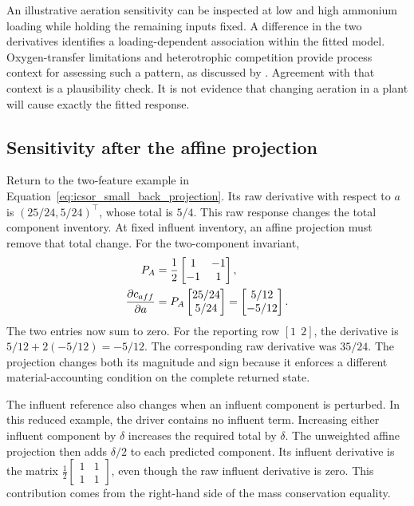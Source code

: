 An illustrative aeration sensitivity can be inspected at low and high ammonium loading while holding the remaining inputs fixed. A difference in the two derivatives identifies a loading-dependent association within the fitted model. Oxygen-transfer limitations and heterotrophic competition provide process context for assessing such a pattern, as discussed by \citet{StenstromSong1991}. Agreement with that context is a plausibility check. It is not evidence that changing aeration in a plant will cause exactly the fitted response.

\subsection{Sensitivity after the affine projection}

Return to the two-feature example in Equation~\eqref{eq:icsor_small_back_projection}. Its raw derivative with respect to \(a\) is \((25/24,5/24)^\top\), whose total is \(5/4\). This raw response changes the total component inventory. At fixed influent inventory, an affine projection must remove that total change. For the two-component invariant,
\begin{equation}
\equationname{Illustrative operating derivative after affine projection}
\label{eq:icsor_small_projection_derivative}
\begin{aligned}
P_A&=\frac{1}{2}\begin{bmatrix}1&-1\\-1&1\end{bmatrix},\\
\frac{\partial c_{aff}}{\partial a}
&=P_A\begin{bmatrix}25/24\\5/24\end{bmatrix}
=\begin{bmatrix}5/12\\-5/12\end{bmatrix}.
\end{aligned}
\end{equation}
The two entries now sum to zero. For the reporting row \([1\ \ 2]\), the derivative is \(5/12+2(-5/12)=-5/12\). The corresponding raw derivative was \(35/24\). The projection changes both its magnitude and sign because it enforces a different material-accounting condition on the complete returned state.

The influent reference also changes when an influent component is perturbed. In this reduced example, the driver contains no influent term. Increasing either influent component by \(\delta\) increases the required total by \(\delta\). The unweighted affine projection then adds \(\delta/2\) to each predicted component. Its influent derivative is the matrix \(\frac12\begin{bmatrix}1&1\\1&1\end{bmatrix}\), even though the raw influent derivative is zero. This contribution comes from the right-hand side of the mass conservation equality.

